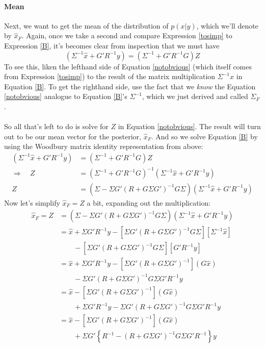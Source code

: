 \documentclass[a4paper,12pt]{scrartcl}
\begin{document}
\paragraph{Mean} 
Next, we want to get the {mean} of the distribution of 
$p(x|y)$, which we'll denote by $\hat{x}_F$.  Again, once we
take a second and compare Expression \ref{tosimp}
to Expression \ref{B}, it's becomes clear from inspection 
that we must have 
\begin{equation}
    \label{notobvious}
    (\Sigma^{-1} \hat{x} + G'R^{-1}y) 
	= \left( \Sigma^{-1} + G'R^{-1}G\right) Z
\end{equation}
To see this, 
liken the lefthand side of Equation \ref{notobvious} (which 
itself comes from Expression \ref{tosimp}) to
the result of the matrix multiplication $\Sigma^{-1}\hat{x}$ in
Equation \ref{B}. To get the righthand side, use the fact
that we \emph{know} the Equation \ref{notobvious} analogue
to Equation \ref{B}'s $\Sigma^{-1}$, which we just 
derived and called $\Sigma_F$.
\\
\\
So all that's left to do is solve for $Z$ in Equation
\ref{notobvious}.  The result will turn out to be our mean
vector for the posterior, $\hat{x}_F$.
And so we solve Equation \ref{B} by using the Woodbury matrix
identity representation from above:
\begin{align*}
    (\Sigma^{-1} \hat{x} + G'R^{-1}y) &= 
	\left( \Sigma^{-1} + G'R^{-1}G\right) Z \\
    \Rightarrow \quad Z &=
	\left( \Sigma^{-1} + G'R^{-1}G\right)^{-1} 
	(\Sigma^{-1} \hat{x} + G'R^{-1}y) \\
    Z &= 
	\left( \Sigma - \Sigma G'(R 
	+ G\Sigma G')^{-1}
	G\Sigma\right) \left(\Sigma^{-1} \hat{x} 
	+ G'R^{-1}y\right)
\end{align*}
Now let's simplify $\hat{x}_F = Z$ a bit, 
expanding out the multiplication:
\begin{align*}
    \hat{x}_F = Z &= 
	\left( \Sigma - \Sigma G'(R 
	+ G\Sigma G')^{-1}
	G\Sigma\right) \left(\Sigma^{-1} \hat{x} 
	+ G'R^{-1}y\right) \\
    &= \hat{x} + \Sigma G' R^{-1} y - 
	\left[\Sigma G' (R + G \Sigma G')^{-1} G \Sigma\right]
	\left[ \Sigma^{-1} \hat{x} \right]  \\
    &\qquad - \left[\Sigma G' (R+ G \Sigma G')^{-1}G\Sigma \right]
	\left[G' R^{-1} y \right] \\
    &= \hat{x} + \Sigma G' R^{-1} y - 
	\left[\Sigma G' (R + G \Sigma G')^{-1}  \right]
	\left( G \hat{x} \right)  \\
    &\qquad - \Sigma G' (R+ G \Sigma G')^{-1}G\Sigma 
	G' R^{-1} y  \\
    &= \hat{x} 
	- \left[\Sigma G' (R + G \Sigma G')^{-1}  \right]
	\left( G \hat{x} \right)  \\
    &\qquad 
	+ \Sigma G'  R^{-1} y 
	- \Sigma G' (R+ G \Sigma G')^{-1}G\Sigma  
	G' R^{-1} y \\
    &= \hat{x} 
	- \left[\Sigma G' (R + G \Sigma G')^{-1}  \right]
	\left( G \hat{x} \right)  \\
    &\qquad 
	+ \Sigma G'  \left\{ R^{-1}  
	-  (R+ G \Sigma G')^{-1}G\Sigma  
	G' R^{-1} \right\} y 
\end{align*}
\end{document}
